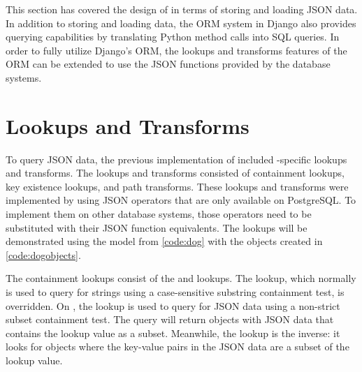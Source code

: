 This section has covered the design of  in terms of storing and
loading JSON data. In addition to storing and loading data, the ORM system in
Django also provides querying capabilities by translating Python method calls
into SQL  queries. In order to fully utilize Django's ORM, the
lookups and transforms features of the ORM can be extended to use the JSON
functions provided by the database systems.

\section{ Lookups and Transforms}

To query JSON data, the previous implementation of  included
-specific lookups and transforms. The lookups and transforms
consisted of containment lookups, key existence lookups, and path transforms.
These lookups and transforms were implemented by using JSON operators that are
only available on PostgreSQL. To implement them on other database systems,
those operators need to be substituted with their JSON function equivalents.
The lookups will be demonstrated using the  model from
\autoref{code:dog} with the objects created in \autoref{code:dogobjects}.

\noindent
\begin{minipage}{\linewidth}

\end{minipage}

\noindent
\begin{minipage}{\linewidth}

\end{minipage}

The containment lookups consist of the  and 
lookups. The  lookup, which normally is used to query for
strings using a case-sensitive substring containment test, is overridden. On
, the lookup is used to query for JSON data using a non-strict
subset containment test. The query will return objects with JSON data that
contains the lookup value as a subset. Meanwhile, the 
lookup is the inverse: it looks for objects where the key-value pairs in the
JSON data are a subset of the lookup value.

